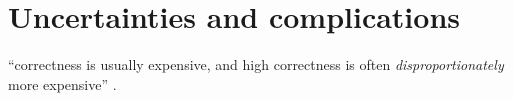 % 
% 


\section{Uncertainties and complications} \label{suncertainties}

``correctness is usually expensive, and high correctness is often
\emph{disproportionately} more expensive'' \citep[p.~153]{janert2010data}.


% 
% 
